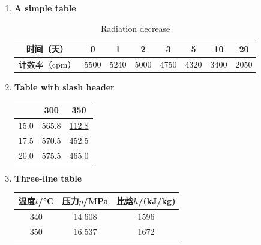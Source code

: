 \begin{solution}
	\begin{enumerate}[nosep,label=(\arabic*)]

		\item \textbf{A simple table} \\
\begin{latexamplev}[]
\begin{table}[H]
  \centering
  \caption{Radiation decrease}
  \label{rad}
  \begin{tabular}{|c|c|c|c|c|c|c|c|}
	\hline
	时间（天） & 0 & 1 & 2 & 3 & 5 & 10 & 20 \\
	\hline
	计数率（cpm） & 5500 & 5240 & 5000 & 4750 & 4320 & 3400 & 2050 \\
	\hline
  \end{tabular}
\end{table}
\end{latexamplev}

		\item \textbf{Table with slash header} \\
\begin{latexamplev}[]
\begin{table}[H]
  \centering
  \begin{tabular}{c|cc}
	\hline
	\diagbox{$p$/\si{MPa}}{$t$/\si{\degreeCelsius}} & 300 & 350 \\
	\hline
	15.0 & 565.8 & \underline{112.8} \\
	17.5 & 570.5 & 452.5 \\
	20.0 & 575.5 & 465.0 \\
	\hline
  \end{tabular}
\end{table}
\end{latexamplev}

		\item \textbf{Three-line table} \\
\begin{latexamplev}[]
\begin{table}[H]
	\centering
	\begin{tabular}{ccc}
		\toprule
		温度$t$/\si{\degreeCelsius} & 压力$p$/\si{\mega\pascal} & 比焓$h$/(\si{kJ/kg}) \\
		\midrule
		340 & 14.608 & 1596 \\
		350 & 16.537 & 1672 \\
		\bottomrule
	\end{tabular}
\end{table}
\end{latexamplev}

	\end{enumerate}
\end{solution}

